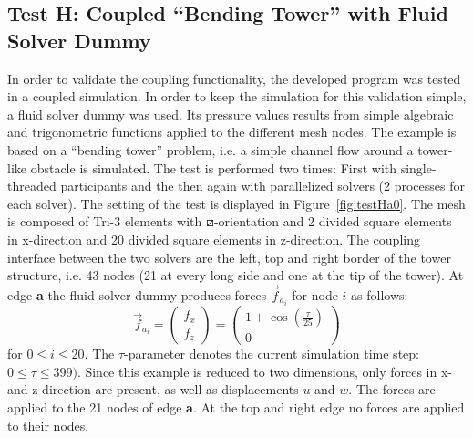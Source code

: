  \subsection{Test H: Coupled ``Bending Tower'' with Fluid Solver Dummy}\label{sec:valid-H}
  In order to validate the coupling functionality, the developed program was tested in a coupled simulation. In order to keep the simulation for this validation simple, a fluid solver dummy was used. Its pressure values results from simple algebraic and trigonometric functions applied to the different mesh nodes. The example is based on a ``bending tower'' problem, i.e. a simple channel flow around a tower-like obstacle is simulated. The test is performed two times: First with single-threaded participants and the then again with parallelized solvers (2 processes for each solver). The setting of the test is displayed in Figure~\ref{fig:testHa0}. The mesh is composed of Tri-3 elements with $\boxslash$-orientation and 2 divided square elements in x-direction and 20 divided square elements in z-direction. The coupling interface between the two solvers are the left, top and right border of the tower structure, i.e. 43 nodes (21 at every long side and one at the tip of the tower). At edge \textbf{a} the fluid solver dummy produces forces $\vec{f}_{a_i}$ for node $i$ as follows:
  \begin{equation*}
  \vec{f}_{a_i} = \begin{pmatrix}
  f_x \\ f_z
  \end{pmatrix} =
  \begin{pmatrix}
  1 + \cos\left(\frac{\tau}{25}\right) \\ 0
  \end{pmatrix}
  \end{equation*}
  for $0 \leq i \leq 20$. The $\tau$-parameter denotes the current simulation time step: $0 \leq \tau \leq 399)$. Since this example is reduced to two dimensions, only forces in x- and z-direction are present, as well as displacements $u$ and $w$. The forces are applied to the 21 nodes of edge \textbf{a}. At the top and right edge no forces are applied to their nodes.
  
